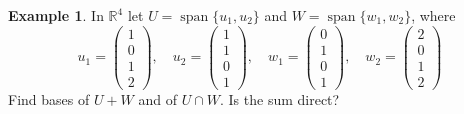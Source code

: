\documentclass[12pt]{article}
\newcommand{\R}{\mathbb R}
\DeclareMathOperator{\Span}{span}
\theoremstyle{definition}
\newtheorem{example}[theorem]{Example}
\begin{document}
\begin{example}\label{r3-exm-sum-intersection-r4}
In \(\R^4\) let \(U=\Span\{u_1,u_2\}\) and \(W=\Span\{w_1,w_2\}\), where
\[
u_1=\begin{pmatrix}1\\0\\1\\2\end{pmatrix},\quad u_2=\begin{pmatrix}1\\1\\0\\1\end{pmatrix},\quad
w_1=\begin{pmatrix}0\\1\\0\\1\end{pmatrix},\quad w_2=\begin{pmatrix}2\\0\\1\\2\end{pmatrix}
\]
Find bases of \(U+W\) and of \(U\cap W\). Is the sum direct?


\end{example}
\end{document}
